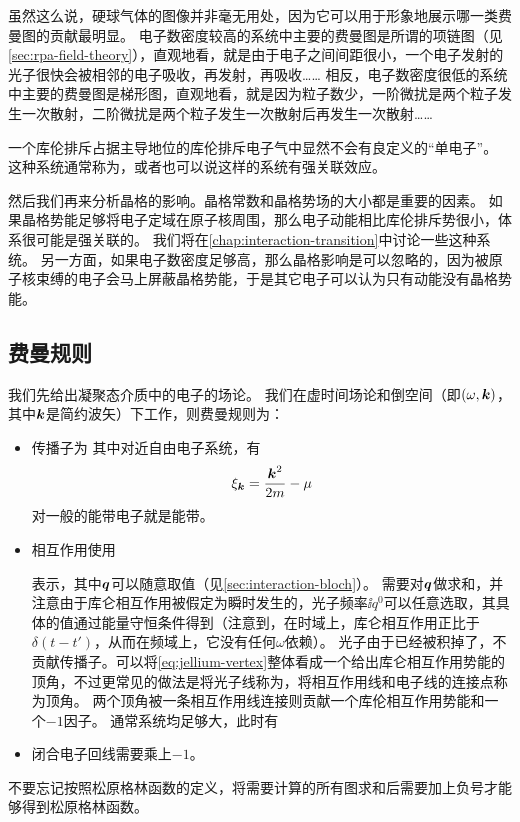 虽然这么说，硬球气体的图像并非毫无用处，因为它可以用于形象地展示哪一类费曼图的贡献最明显。
电子数密度较高的系统中主要的费曼图是所谓的项链图（见\autoref{sec:rpa-field-theory}），直观地看，就是由于电子之间间距很小，一个电子发射的光子很快会被相邻的电子吸收，再发射，再吸收……
相反，电子数密度很低的系统中主要的费曼图是梯形图，直观地看，就是因为粒子数少，一阶微扰是两个粒子发生一次散射，二阶微扰是两个粒子发生一次散射后再发生一次散射……

一个库伦排斥占据主导地位的库伦排斥电子气中显然不会有良定义的“单电子”。
这种系统通常称为，或者也可以说这样的系统有强关联效应。

然后我们再来分析晶格的影响。晶格常数和晶格势场的大小都是重要的因素。
如果晶格势能足够将电子定域在原子核周围，那么电子动能相比库伦排斥势很小，体系很可能是强关联的。
我们将在\autoref{chap:interaction-transition}中讨论一些这种系统。
另一方面，如果电子数密度足够高，那么晶格影响是可以忽略的，因为被原子核束缚的电子会马上屏蔽晶格势能，于是其它电子可以认为只有动能没有晶格势能。

\subsection{费曼规则}

我们先给出凝聚态介质中的电子的场论。
我们在虚时间场论和倒空间（即$(\omega, \vb*{k})$，其中$\vb*{k}$是简约波矢）下工作，则费曼规则为：
\begin{itemize}
    \item 传播子为
    其中对近自由电子系统，有
    \begin{equation}
        \xi_{\vb*{k}} = \frac{\vb*{k}^2}{2m} - \mu
    \end{equation}
    对一般的能带电子就是能带。
    \item 相互作用使用
    
    表示，其中$\vb*{q}$可以随意取值（见\autoref{sec:interaction-bloch}）。
    需要对$\vb*{q}$做求和，并注意由于库仑相互作用被假定为瞬时发生的，光子频率$\ii q^0$可以任意选取，其具体的值通过能量守恒条件得到（注意到，在时域上，库仑相互作用正比于$\delta(t - t')$，从而在频域上，它没有任何$\omega$依赖）。
    光子由于已经被积掉了，不贡献传播子。可以将\eqref{eq:jellium-vertex}整体看成一个给出库仑相互作用势能的顶角，不过更常见的做法是将光子线称为，将相互作用线和电子线的连接点称为顶角。
    两个顶角被一条相互作用线连接则贡献一个库伦相互作用势能和一个$-1$因子。
    通常系统均足够大，此时有
    \item 闭合电子回线需要乘上$-1$。
\end{itemize}
不要忘记按照松原格林函数的定义，将需要计算的所有图求和后需要加上负号才能够得到松原格林函数。

